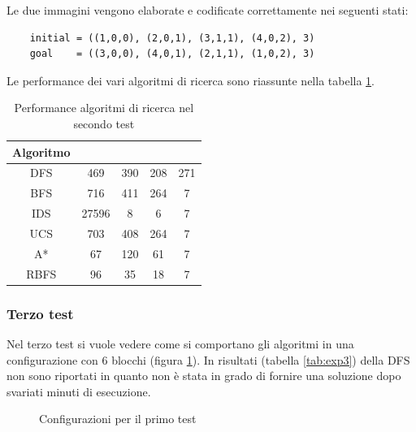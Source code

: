 \documentclass{article}
\begin{document}
	\noindent Le due immagini vengono elaborate e codificate correttamente nei seguenti stati:
	\begin{verbatim}
	initial = ((1,0,0), (2,0,1), (3,1,1), (4,0,2), 3)
	goal    = ((3,0,0), (4,0,1), (2,1,1), (1,0,2), 3)
	\end{verbatim}
	Le performance dei vari algoritmi di ricerca sono riassunte nella tabella \ref{tab:exp2}.
	\begin{table}[H]
		\centering
		\def\arraystretch{1.5}
		\begin{tabular}{|c|c|c|c|c|}
			\hline
			\textbf{Algoritmo} & \bm{$n$} & \bm{$m$} & \bm{$\mu$} & \bm{$l$} \\
			\hline
			DFS & 469 & 390 & 208 & 271 \\
			\hline
			BFS &  716 & 411 & 264 & 7 \\
			\hline
			IDS &  27596 & 8 & 6 & 7 \\
			\hline
			UCS &  703 & 408 & 264 & 7 \\
			\hline
			A* &  67 & 120 & 61 & 7 \\
			\hline
			RBFS &  96 & 35 & 18 & 7 \\
			\hline
			
		\end{tabular}
		\caption{Performance algoritmi di ricerca nel secondo test}
		\label{tab:exp2}
	\end{table}
	
	
	\subsubsection{Terzo test}
	Nel terzo test si vuole vedere come si comportano gli algoritmi in una configurazione con 6 blocchi (figura \ref{fig:exp3}). In risultati (tabella \ref{tab:exp3}) della DFS  non sono riportati in quanto non è stata in grado di fornire una soluzione dopo svariati minuti di esecuzione.
	\begin{figure}[H]
		\centering
		\protect\caption{Configurazioni per il primo test}
		\label{fig:exp3}
	\end{figure}
	
\end{document}

